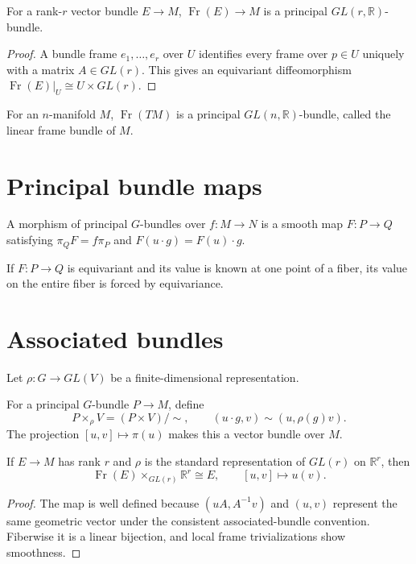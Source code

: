 \begin{theorem}\label{thm:vii08-frame-principal}
For a rank-\(r\) vector bundle \(E\to M\), \(\operatorname{Fr}(E)\to M\) is a principal \(GL(r,\mathbb R)\)-bundle.
\end{theorem}
\begin{proof}
A bundle frame \(e_1,\ldots,e_r\) over \(U\) identifies every frame over \(p\in U\) uniquely with a matrix \(A\in GL(r)\). This gives an equivariant diffeomorphism \(\operatorname{Fr}(E)|_U\cong U\times GL(r)\).
\end{proof}

\begin{corollary}\label{cor:vii08-lin-frame}
For an \(n\)-manifold \(M\), \(\operatorname{Fr}(TM)\) is a principal \(GL(n,\mathbb R)\)-bundle, called the linear frame bundle of \(M\).
\end{corollary}

\section{Principal bundle maps}
\begin{definition}\label{def:vii08-principal-map}
A morphism of principal \(G\)-bundles over \(f:M\to N\) is a smooth map \(F:P\to Q\) satisfying \(\pi_QF=f\pi_P\) and \(F(u\cdot g)=F(u)\cdot g\).
\end{definition}

\begin{proposition}\label{prop:vii08-equivariant-determined}
If \(F:P\to Q\) is equivariant and its value is known at one point of a fiber, its value on the entire fiber is forced by equivariance.
\end{proposition}

\section{Associated bundles}
Let \(\rho:G\to GL(V)\) be a finite-dimensional representation.
\begin{definition}\label{def:vii08-associated}
For a principal \(G\)-bundle \(P\to M\), define
\[
P\times_\rho V=(P\times V)/\sim,
\qquad
(u\cdot g,v)\sim(u,\rho(g)v).
\]
The projection \([u,v]\mapsto\pi(u)\) makes this a vector bundle over \(M\).
\end{definition}

\begin{theorem}\label{thm:vii08-recover-vector}
If \(E\to M\) has rank \(r\) and \(\rho\) is the standard representation of \(GL(r)\) on \(\mathbb R^r\), then
\[
\operatorname{Fr}(E)\times_{GL(r)}\mathbb R^r\cong E,
\qquad [u,v]\mapsto u(v).
\]
\end{theorem}
\begin{proof}
The map is well defined because \((uA,A^{-1}v)\) and \((u,v)\) represent the same geometric vector under the consistent associated-bundle convention. Fiberwise it is a linear bijection, and local frame trivializations show smoothness.
\end{proof}


